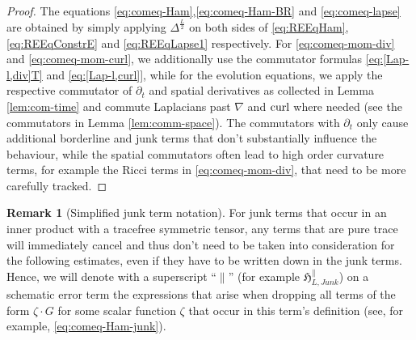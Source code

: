 \documentclass[11pt,leqno,textwidth=10cm]{amsart}
\numberwithin{equation}{section}
\theoremstyle{definition}
\newtheorem{remark}[definition]{Remark}
\theoremstyle{plain}
\newcommand{\1}{\mathbbm{1}}
\newcommand{\Ric}{\text{\normalfont{Ric}}}
\newcommand{\del}{\partial}
\newcommand{\Lap}{\Delta}
\newcommand{\curl}{\text{\normalfont{curl}}}
\newcommand{\change}[1]{\color{black}#1\color{black}}
\begin{document}
\begin{proof}
The equations \eqref{eq:comeq-Ham},\eqref{eq:comeq-Ham-BR} and \eqref{eq:comeq-lapse} are obtained by simply applying $\Lap^\frac{L}2$ on both sides of \eqref{eq:REEqHam},\eqref{eq:REEqConstrE} and \eqref{eq:REEqLapse1} respectively. For \eqref{eq:comeq-mom-div} and \eqref{eq:comeq-mom-curl}, we additionally use the commutator formulas \eqref{eq:[Lap-l,div]T} and \eqref{eq:[Lap-l,curl]}, while for the evolution equations, we apply the respective commutator of $\del_t$ and spatial derivatives as collected in Lemma \ref{lem:com-time} and commute Laplacians past $\nabla$ and $\curl$ where needed (see the commutators in Lemma \ref{lem:comm-space}). The commutators with $\del_t$ only cause additional borderline and junk terms that don't substantially influence the behaviour, while the spatial commutators often lead to high order curvature terms, for example the Ricci terms in \eqref{eq:comeq-mom-div}, that need to be more carefully tracked.
\end{proof}

\begin{remark}[Simplified junk term notation]\label{rem:notation-parallel}
For junk terms that occur in an inner product with a tracefree symmetric tensor, any terms that are \change{pure trace }will immediately cancel and thus don't need to be taken into consideration for the following estimates, even if they have to be written down in the junk terms. Hence, we will denote with a superscript \enquote{$\parallel$} (for example $\mathfrak{H}_{L,Junk}^\parallel$) on a schematic error term the expressions that arise when dropping all terms of the form $\zeta\cdot G$ for some scalar function $\zeta$ \change{that }occur in this term's definition (see, for example, \eqref{eq:comeq-Ham-junk}).%
\end{remark}
\end{document}
